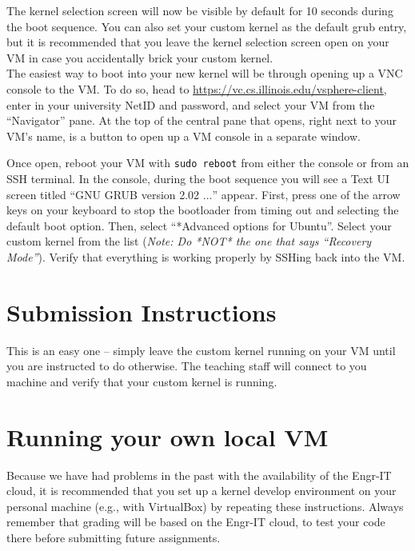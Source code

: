 \documentclass[10pt]{article}
\begin{document}
The kernel selection screen will now be visible by default for 10 seconds during the boot sequence. You can also set your custom kernel as the default grub entry, but it is recommended that you leave the kernel selection screen open on your VM in case you accidentally brick your custom kernel.\\

The easiest way to boot into your new kernel will be through opening up a VNC console to the VM. To do so, head to \url{https://vc.cs.illinois.edu/vsphere-client}, enter in your university NetID and password, and select your VM from the ``Navigator'' pane. At the top of the central pane that opens, right next to your VM's name, is a button to open up a VM console in a separate window.

Once open, reboot your VM with {\tt sudo reboot} from either the console or from an SSH terminal. In the console, during the boot sequence you will see a Text UI screen titled ``GNU GRUB version 2.02 $\dots$'' appear. First, press one of the arrow keys on your keyboard to stop the bootloader from timing out and selecting the default boot option. Then, select ``*Advanced options for Ubuntu''. Select your custom kernel from the list ({\it Note: Do *NOT* the one that says ``Recovery Mode''}). Verify that everything is working properly by SSHing back into the VM.


\section{Submission Instructions}

This is an easy one -- simply leave the custom kernel running on your VM until you are instructed to do otherwise. The teaching staff will connect to you machine and verify that your custom kernel is running.

\section{Running your own local VM}

Because we have had problems in the past with the availability of the Engr-IT cloud, it is recommended that you set up a kernel develop environment on your personal machine (e.g., with VirtualBox) by repeating these instructions. Always remember that grading will be based on the Engr-IT cloud, to test your code there before submitting future assignments.
\end{document}

